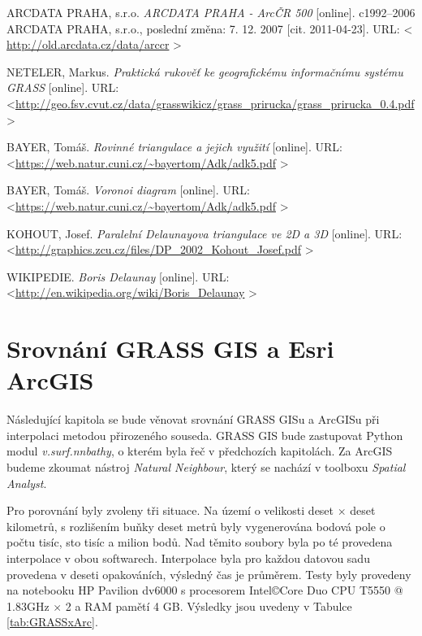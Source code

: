 \documentclass[12pt,a4paper]{article}
\begin{document}
{\begin{thebibliography}{99}
ARCDATA PRAHA, s.r.o. \textit{ARCDATA PRAHA - ArcČR 500} [online].
c1992–2006 ARCDATA PRAHA, s.r.o., poslední změna: 7. 12. 2007 [cit. 2011-04-23].
URL: \textless
\url{http://old.arcdata.cz/data/arccr} \textgreater

NETELER, Markus. \textit{Praktická rukověť ke geografickému informačnímu systému GRASS} [online].
URL: \textless\url{http://geo.fsv.cvut.cz/data/grasswikicz/grass_prirucka/grass_prirucka_0.4.pdf}
\textgreater

BAYER, Tomáš. \textit{Rovinné triangulace a jejich využití} [online].
URL: \textless\url{https://web.natur.cuni.cz/~bayertom/Adk/adk5.pdf}
\textgreater

BAYER, Tomáš. \textit{Voronoi diagram} [online].
URL: \textless\url{https://web.natur.cuni.cz/~bayertom/Adk/adk5.pdf}
\textgreater

KOHOUT, Josef. \textit{Paralelní Delaunayova triangulace
ve 2D a 3D} [online].
URL: \textless\url{http://graphics.zcu.cz/files/DP_2002_Kohout_Josef.pdf}
\textgreater

WIKIPEDIE. \textit{Boris Delaunay} [online].
URL: \textless\url{http://en.wikipedia.org/wiki/Boris_Delaunay}
\textgreater

\end{thebibliography}

\appendix
\newpage
\section{Srovnání GRASS GIS a Esri ArcGIS}
\label{app:srovnani}

Následující kapitola se bude věnovat srovnání GRASS GISu a ArcGISu při
interpolaci metodou přirozeného souseda. GRASS GIS bude zastupovat
Python modul \emph{v.surf.nnbathy}, o kterém byla řeč v předchozích
kapitolách. Za ArcGIS budeme zkoumat nástroj \emph{Natural Neighbour},
který se nachází v toolboxu \emph{Spatial Analyst}.

Pro porovnání byly zvoleny tři situace. Na území o velikosti deset
$\times$ deset kilometrů, s rozlišením buňky deset metrů byly vygenerována
bodová pole o počtu tisíc, sto tisíc a milion bodů. Nad těmito soubory
byla po té provedena interpolace v obou softwarech. Interpolace byla
pro každou datovou sadu provedena v deseti opakováních, výsledný čas
je průměrem. Testy byly provedeny na notebooku HP Pavilion dv6000 s
procesorem Intel\copyright Core Duo CPU T5550 @
1.83GHz $\times$ 2 a RAM pamětí 4 GB. Výsledky jsou uvedeny v Tabulce
\ref{tab:GRASSxArc}.

}
\end{document}
